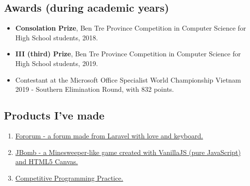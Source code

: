 \documentclass{article}
\begin{document}
        \subsection{Awards (during academic years)}
            \begin{itemize}
                \item {\textbf{Consolation Prize}}, Ben Tre Province Competition in Computer Science for High School students, 2018.
                \item {\textbf{III (third) Prize}}, Ben Tre Province Competition in Computer Science for High School students, 2019.
                \item Contestant at the Microsoft Office Specialist World Championship Vietnam 2019 - Southern Elimination Round, with 832 points.
            \end{itemize}

        \subsection{Products I've made}
            \begin{enumerate}
                \item \href{https://github.com/trhgquan/Fororum}{Fororum - a forum made from Laravel with love and keyboard.}
                \item \href{https://github.com/trhgquan/JBomb}{JBomb - a Minesweeper-like game created with VanillaJS (pure JavaScript) and HTML5 Canvas.}
                \item \href{https://github.com/trhgquan/CPP}{Competitive Programming Practice.}
            \end{enumerate}
\end{document}

